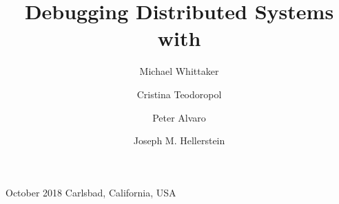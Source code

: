 \documentclass[sigconf]{acmart}
\begin{document}
\title{Debugging Distributed Systems with \WatProvenance{}}
%
              {October 2018}%
              {Carlsbad, California, USA}

\author{Michael Whittaker}

\author{Cristina Teodoropol}

\author{Peter Alvaro}

\author{Joseph M. Hellerstein}
\renewcommand{\shortauthors}{M. Whittaker et al.}

{}
\maketitle
{}
{}
{}
{}
{}
{}
{}
{}



\end{document}
